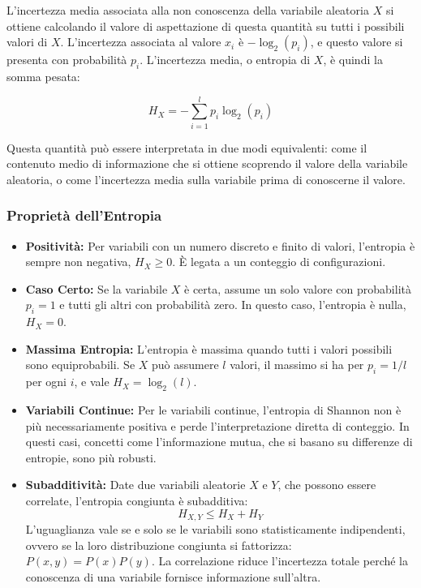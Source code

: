 L'incertezza media associata alla non conoscenza della variabile aleatoria $X$ si ottiene calcolando il valore di aspettazione di questa quantità su tutti i possibili valori di $X$. L'incertezza associata al valore $x_i$ è $-\log_2(p_i)$, e questo valore si presenta con probabilità $p_i$. L'incertezza media, o entropia di $X$, è quindi la somma pesata:

\begin{tcolorbox}[colback=yellow!30,  
                  colframe=yellow!50!orange,  
                  boxrule=0.8pt, 
                  arc=3pt,  
                  top=4pt, bottom=4pt, left=6pt, right=6pt,
                  enhanced,
                  sharp corners=south]
\begin{equation}
H_X = -\sum_{i=1}^{l} p_i \log_2(p_i)
\end{equation}
\end{tcolorbox}



Questa quantità può essere interpretata in due modi equivalenti: come il contenuto medio di informazione che si ottiene scoprendo il valore della variabile aleatoria, o come l'incertezza media sulla variabile prima di conoscerne il valore.

\subsubsection{Proprietà dell'Entropia}
\begin{itemize}
 \item \textbf{Positività:} Per variabili con un numero discreto e finito di valori, l'entropia è sempre non negativa, $H_X \ge 0$. È legata a un conteggio di configurazioni.
 \item \textbf{Caso Certo:} Se la variabile $X$ è certa, assume un solo valore con probabilità $p_i=1$ e tutti gli altri con probabilità zero. In questo caso, l'entropia è nulla, $H_X = 0$.
\item \textbf{Massima Entropia:} L'entropia è massima quando tutti i valori possibili sono equiprobabili. Se $X$ può assumere $l$ valori, il massimo si ha per $p_i = 1/l$ per ogni $i$, e vale $H_X = \log_2(l)$.
\item \textbf{Variabili Continue:} Per le variabili continue, l'entropia di Shannon non è più necessariamente positiva e perde l'interpretazione diretta di conteggio. In questi casi, concetti come l'informazione mutua, che si basano su differenze di entropie, sono più robusti.
 \item \textbf{Subadditività:} Date due variabili aleatorie $X$ e $Y$, che possono essere correlate, l'entropia congiunta è subadditiva:
\begin{equation}
H_{X,Y} \le H_X + H_Y
\end{equation}
L'uguaglianza vale se e solo se le variabili sono statisticamente indipendenti, ovvero se la loro distribuzione congiunta si fattorizza: $P(x,y) = P(x)P(y)$. La correlazione riduce l'incertezza totale perché la conoscenza di una variabile fornisce informazione sull'altra.
\end{itemize}

